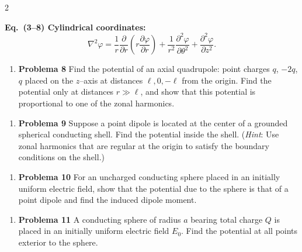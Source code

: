 \documentclass{article}
\newenvironment{MyColorPar}[1]{%
\leavevmode\color{#1}\ignorespaces%
}{%
}%
\begin{document}
\begin{multicols}{2}
\begin{enumerate}[label={{\textcolor{trueblue}{\textbf{Pr.} \arabic*.7}}}, start=3]
\begin{MyColorPar}{orange(colorwheel)}
\textbf{Eq.~(3–8) Cylindrical coordinates:}
\[
\nabla^{2}\varphi =
\frac{1}{r}\frac{\partial}{\partial r}\!\left(
r \frac{\partial \varphi}{\partial r}\right)
+ \frac{1}{r^{2}}\frac{\partial^{2}\varphi}{\partial \theta^{2}}
+ \frac{\partial^{2}\varphi}{\partial z^{2}} .
\]
\end{MyColorPar}

\end{enumerate}


\begin{enumerate}[label={{\textcolor{trueblue}{\textbf{Pr.} \arabic*.8}}}, start=3]
\item \textbf{Problema 8} Find the potential of an axial quadrupole: point charges $q$, $-2q$, $q$ placed on the $z$–axis at distances $\ell, 0, -\ell$ from the origin. Find the potential only at distances $r \gg \ell$, and show that this potential is proportional to one of the zonal harmonics.
\end{enumerate}

\begin{enumerate}[label={{\textcolor{trueblue}{\textbf{Pr.} \arabic*.9}}}, start=3]
\item \textbf{Problema 9} Suppose a point dipole is located at the center of a grounded spherical conducting shell. Find the potential inside the shell. (\emph{Hint}: Use zonal harmonics that are regular at the origin to satisfy the boundary conditions on the shell.)
\end{enumerate}

\begin{enumerate}[label={{\textcolor{trueblue}{\textbf{Pr.} \arabic*.10}}}, start=3]
\item \textbf{Problema 10} For an uncharged conducting sphere placed in an initially uniform electric field, show that the potential due to the sphere is that of a point dipole and find the induced dipole moment.
\end{enumerate}

\begin{enumerate}[label={{\textcolor{trueblue}{\textbf{Pr.} \arabic*.11}}}, start=3]
\item \textbf{Problema 11} A conducting sphere of radius $a$ bearing total charge $Q$ is placed in an initially uniform electric field $E_{0}$. Find the potential at all points exterior to the sphere.
\end{enumerate}


\end{multicols}
\end{document}
